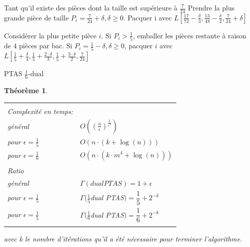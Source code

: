 \documentclass[a4paper,12pt]{report}
\theoremstyle{plain}				%
\newtheorem{theoreme}{Théorème}	%
\theoremstyle{definition}				%
\begin{document}
\begin{algorithm}[H]
Tant qu'il existe des pièces dont la taille est supérieure à $\frac{7}{24}$
Prendre la plus grande pièce de taille $P_i = \frac{7}{24}+\delta, \delta \geq 0$.
Pacquer i avec 
$L[\frac{17}{72}-\frac{\delta}{3}, 
   \frac{13}{48}-\frac{\delta}{2}, 
   \frac{7}{24}+\delta]$ 
   
Considérer la plus petite pièce $i$.
Si $P_i>\frac{1}{5}$, emballer les pièces restante à raison de $4$ pièces par bac.
Si $P_i=\frac{1}{5}-\delta, \delta \geq 0$, pacquer $i$ avec
$L[\frac{1}{5}+\frac{\delta}{4}, 
   \frac{1}{5}+\frac{2 \cdot \delta}{3}, 
   \frac{1}{5}+\frac{3 \cdot \delta}{2},
   \frac{7}{24}]$

\BlankLine %



\caption{PTAS $\frac{1}{6}$-dual}
\label{algo:PTASDual1_6}
\end{algorithm}

\bigskip

\begin{theoreme}
\begin{flushleft}
\begin{tabular}{|p{8cm}p{6cm}|}
\hline
& \\
Complexité en temps:& \\
général& 
	$ O(( \frac{n}{\epsilon})^\frac{1}{\epsilon ^ 2})$\\
pour $ \epsilon = \frac{1}{5}$ & 
	$O(n \cdot (k + \log(n)))$ \\
pour $ \epsilon = \frac{1}{6}$ & 
	$O(n \cdot (k \cdot m^4 + \log(n)))$

\\	%
& \\
Ratio & \\
général &
	$\Gamma(dual PTAS) = 1 + \epsilon$\\
	
pour $ \epsilon = \frac{1}{5}$ & 
	$\Gamma(\frac{1}{5}$dual PTAS$) = \dfrac{1}{5} + 2^{-k}$\\
		
pour $ \epsilon = \frac{1}{5}$ & 
	$\Gamma(\frac{1}{6}$dual PTAS$) = \dfrac{1}{6} + 2^{-k}$
\\
& \\
\hline
\end{tabular}
\end{flushleft}
avec k le nombre d'itérations qu'il a été nécessaire pour terminer l'algorithme.
\end{theoreme}
\end{document}
